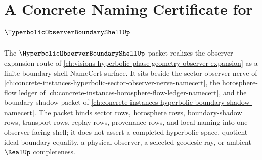 \chapter{A Concrete Naming Certificate for $\HyperbolicObserverBoundaryShellUp$}
\label{ch:concrete-instances-hyperbolic-observer-boundary-shell-namecert}

The $\HyperbolicObserverBoundaryShellUp$ packet realizes the observer-expansion route of \autoref{ch:visions-hyperbolic-phase-geometry-observer-expansion} as a finite boundary-shell NameCert surface. It sits beside the sector observer nerve of \autoref{ch:concrete-instances-hyperbolic-sector-observer-nerve-namecert}, the horosphere-flow ledger of \autoref{ch:concrete-instances-horosphere-flow-ledger-namecert}, and the boundary-shadow packet of \autoref{ch:concrete-instances-hyperbolic-boundary-shadow-namecert}. The packet binds sector rows, horosphere rows, boundary-shadow rows, transport rows, replay rows, provenance rows, and local naming into one observer-facing shell; it does not assert a completed hyperbolic space, quotient ideal-boundary equality, a physical observer, a selected geodesic ray, or ambient $\RealUp$ completeness.

